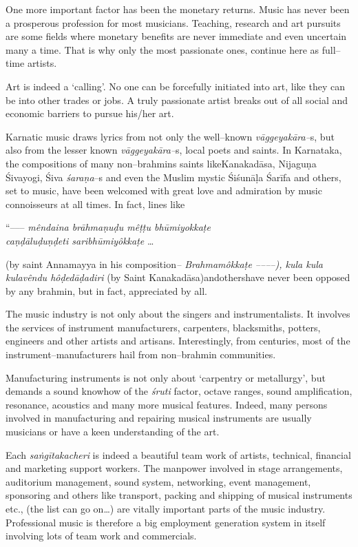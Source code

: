 One more important factor has been the monetary returns. Music has never been a prosperous profession for most musicians. Teaching, research and art pursuits are some fields where monetary benefits are never immediate and even uncertain many a time. That is why only the most passionate ones, continue here as full–time artists.

Art is indeed a ‘calling’. No one can be forcefully initiated into art, like they can be into other trades or jobs. A truly passionate artist breaks out of all social and economic barriers to pursue his/her art.

Karnatic music draws lyrics from not only the well–known \textit{vāggeyakāra–}s, but also from the lesser known \textit{vāggeyakāra–}s, local poets and saints. In Karnataka, the compositions of many non–brahmins saints like\break Kanakadāsa, Nijaguṇa Śivayogi, Śiva \textit{śaraṇa}–s and even the Muslim mystic Śiśunāḷa Śarīfa and others, set to music, have been welcomed with great love and admiration by music connoisseurs at all times. In fact, lines like

\begin{myquote}
“––– \textit{mêndaina brāhmaṇuḍu mêṭṭu bhūmiyokkaṭe \\ caṇḍāluḍuṇḍeti saribhūmiyôkkaṭe} … 
\end{myquote}

(by saint Annamayya in his composition\textit{– Brahmamôkkaṭe ––––), kula kula kulavêndu hôḍedāḍadiri} (by Saint Kanakadāsa)andothershave never been opposed by any brahmin, but in fact, appreciated by all.

The music industry is not only about the singers and instrumentalists. It involves the services of instrument manufacturers, carpenters, blacksmiths, potters, engineers and other artists and artisans. Interestingly, from centuries, most of the instrument–manufacturers hail from non–brahmin communities.

Manufacturing instruments is not only about ‘carpentry or metallurgy’, but demands a sound knowhow of the \textit{śruti} factor, octave ranges, sound amplification, resonance, acoustics and many more musical features. Indeed, many persons involved in manufacturing and repairing musical instruments are usually musicians or have a keen understanding of the art.

Each\textit{ saṅgīta}\textit{kacheri} is indeed a beautiful team work of artists, technical, financial and marketing support workers. The manpower involved in stage arrangements, auditorium management, sound system, networking, event management, sponsoring and others like transport, packing and shipping of musical instruments etc., (the list can go on…) are vitally important parts of the music industry. Professional music is therefore a big employment generation system in itself involving lots of team work and commercials.

